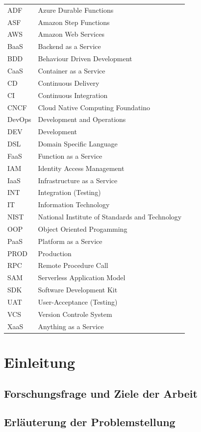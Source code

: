 \documentclass[11pt]{article}
\begin{document}
\begin{tabular}{ p{2cm} p{10cm}} 
ADF & Azure Durable Functions \\
ASF & Amazon Step Functions \\
AWS & Amazon Web Services \\
BaaS & Backend as a Service \\
BDD & Behaviour Driven Development \\
CaaS & Container as a Service \\  
CD & Continuous Delivery \\  
CI & Continuous Integration \\
CNCF & Cloud Native Computing Foundatino \\
DevOps & Development and Operations \\  
DEV & Development \\
DSL & Domain Specific Language \\
FaaS & Function as a Service \\ 
IAM & Identity Access Management \\
IaaS & Infrastructure as a Service \\
INT & Integration (Testing) \\
IT & Information Technology \\
NIST & National Institute of Standards and Technology\\
OOP & Object Oriented Progamming \\
PaaS & Platform as a Service \\
PROD & Production \\
RPC & Remote Procedure Call \\
SAM & Serverless Application Model \\
SDK & Software Development Kit \\
UAT & User-Acceptance (Testing) \\
VCS & Version Controle System \\
XaaS & Anything as a Service \\
 
\end{tabular}
\newpage
\tableofcontents
\newpage
\section{Einleitung}
\subsection{Forschungsfrage und Ziele der Arbeit}
\subsection{Erläuterung der Problemstellung}
\end{document}
